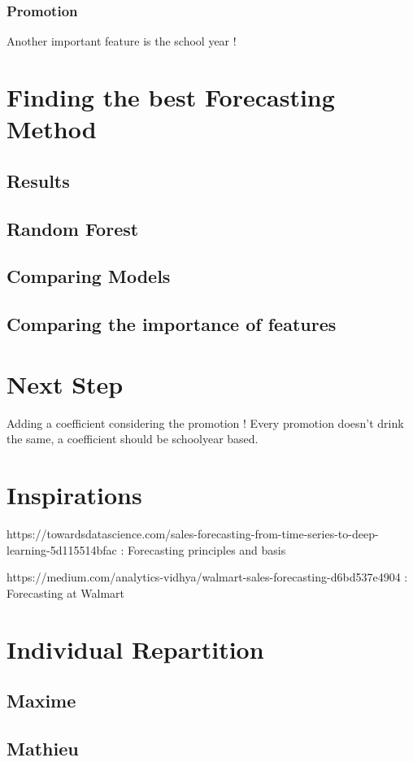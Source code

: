 \documentclass{report}
\begin{document}
\subsection{Promotion}
Another important feature is the school year !



\chapter{Finding the best Forecasting Method}

\section{Results}

\section{Random Forest}

\section{Comparing Models}



\section{Comparing the importance of features}


\chapter{Next Step}

Adding a coefficient considering the promotion ! Every promotion doesn't drink the same, a coefficient should be schoolyear based.

\chapter{Inspirations}

https://towardsdatascience.com/sales-forecasting-from-time-series-to-deep-learning-5d115514bfac : Forecasting principles and basis 

https://medium.com/analytics-vidhya/walmart-sales-forecasting-d6bd537e4904 : Forecasting at Walmart 


\chapter{Individual Repartition}

\section{Maxime}

\section{Mathieu}
\end{document}
